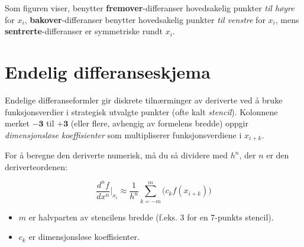 Som figuren viser, benytter \textbf{fremover}-differanser hovedsakelig punkter \emph{til høyre} for \(x_i\),
\textbf{bakover}-differanser benytter hovedsakelig punkter \emph{til venstre} for \(x_i\),
mens \textbf{sentrerte}-differanser er symmetriske rundt \(x_i\).


\section*{Endelig differanseskjema}

Endelige differanseformler gir diskrete tilnærminger av deriverte ved å bruke funksjonsverdier i strategisk utvalgte punkter (ofte kalt \emph{stencil}).
Kolonnene merket \(\mathbf{-3}\) til \(\mathbf{+3}\) (eller flere, avhengig av formelens bredde) oppgir \emph{dimensjonsløse koeffisienter} som multipliserer funksjonsverdiene i \(x_{i + k}\).

For å beregne den deriverte numerisk, må du så dividere med \(h^n\), der \(n\) er den deriverteordenen:

\[
  \frac{d^n f}{dx^n} \Bigg|_{x_i} \approx \frac{1}{h^n} \sum_{k=-m}^{m} \bigl( c_k f(x_{i+k}) \bigr)
\]

\begin{itemize}
  \item \(m\) er halvparten av stencilens bredde (f.eks. 3 for en 7-punkts stencil).
  \item \(c_k\) er dimensjonsløse koeffisienter.
\end{itemize}

